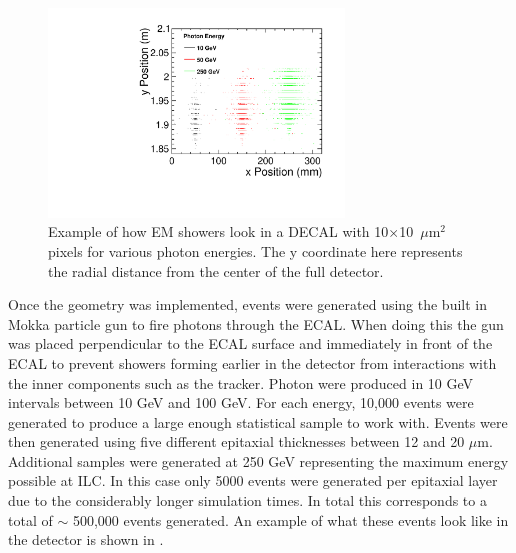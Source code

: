 \begin{figure}
  \centering
  \includegraphics[width=0.7\textwidth,keepaspectratio]{DECALStudies/fig/ExampleEvents}
  \caption[Example of how EM showers look in a \ac{DECAL} with 10$\times$10~$\mu$m$^2$ pixels for various photon energies.]{Example of how EM showers look in a \ac{DECAL} with 10$\times$10~$\mu$m$^2$ pixels for various photon energies. The y coordinate here represents the radial distance from the center of the full detector.}
  \label{fig:exampleevents}
\end{figure}

Once the geometry was implemented, events were generated using the built in Mokka particle gun to fire photons through the \ac{ECAL}. When doing this the gun was placed perpendicular to the \ac{ECAL} surface and immediately in front of the \ac{ECAL} to prevent showers forming earlier in the detector from interactions with the inner components such as the tracker. Photon were produced in 10 GeV intervals between 10 GeV and 100 GeV. For each energy, 10,000 events were generated to produce a large enough statistical sample to work with. Events were then generated using five different epitaxial thicknesses between 12 and 20 $\mu$m. Additional samples were generated at 250 GeV representing the maximum energy possible at \ac{ILC}. In this case only 5000 events were generated per epitaxial layer due to the considerably longer simulation times. In total this corresponds to a total of $\sim$ 500,000 events generated. An example of what these events look like in the detector is shown in .

